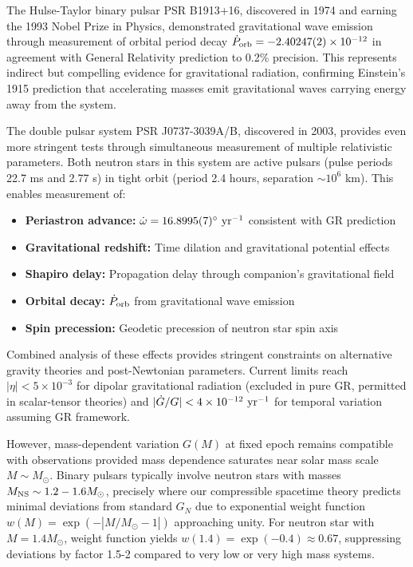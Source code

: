\documentclass[11pt,a4paper]{article}
\providecommand{\tightlist}{\setlength{\itemsep}{0pt}\setlength{\parskip}{0pt}}
\begin{document}
The Hulse-Taylor binary pulsar PSR B1913+16, discovered in 1974 and
earning the 1993 Nobel Prize in Physics, demonstrated gravitational wave
emission through measurement of orbital period decay
\(\dot{P}_{\rm orb} = -2.40247(2) \times 10^{-12}\) in agreement with
General Relativity prediction to 0.2\% precision. This represents
indirect but compelling evidence for gravitational radiation, confirming
Einstein's 1915 prediction that accelerating masses emit gravitational
waves carrying energy away from the system.

The double pulsar system PSR J0737-3039A/B, discovered in 2003, provides
even more stringent tests through simultaneous measurement of multiple
relativistic parameters. Both neutron stars in this system are active
pulsars (pulse periods 22.7 ms and 2.77 s) in tight orbit (period 2.4
hours, separation \(\sim 10^6\) km). This enables measurement of:

\begin{itemize}
\tightlist
\item
  \textbf{Periastron advance:}
  \(\dot{\omega} = 16.8995(7)^\circ~{\rm yr^{-1}}\) consistent with GR
  prediction
\item
  \textbf{Gravitational redshift:} Time dilation and gravitational
  potential effects
\item
  \textbf{Shapiro delay:} Propagation delay through companion's
  gravitational field
\item
  \textbf{Orbital decay:} \(\dot{P}_{\rm orb}\) from gravitational wave
  emission
\item
  \textbf{Spin precession:} Geodetic precession of neutron star spin
  axis
\end{itemize}

Combined analysis of these effects provides stringent constraints on
alternative gravity theories and post-Newtonian parameters. Current
limits reach \(|\eta| < 5 \times 10^{-3}\) for dipolar gravitational
radiation (excluded in pure GR, permitted in scalar-tensor theories) and
\(|\dot{G}/G| < 4 \times 10^{-12}~{\rm yr^{-1}}\) for temporal variation
assuming GR framework.

However, mass-dependent variation \(G(M)\) at fixed epoch remains
compatible with observations provided mass dependence saturates near
solar mass scale \(M \sim M_\odot\). Binary pulsars typically involve
neutron stars with masses \(M_{\rm NS} \sim 1.2-1.6 M_\odot\), precisely
where our compressible spacetime theory predicts minimal deviations from
standard \(G_N\) due to exponential weight function
\(w(M) = \exp(-|M/M_\odot - 1|)\) approaching unity. For neutron star
with \(M = 1.4 M_\odot\), weight function yields
\(w(1.4) = \exp(-0.4) \approx 0.67\), suppressing deviations by factor
1.5-2 compared to very low or very high mass systems.
\end{document}
